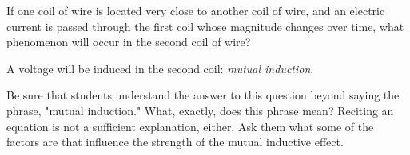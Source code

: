 

If one coil of wire is located very close to another coil of wire, and an electric current is passed through the first coil whose magnitude changes over time, what phenomenon will occur in the second coil of wire?







A voltage will be induced in the second coil: {\it mutual induction}.







Be sure that students understand the answer to this question beyond saying the phrase, "mutual induction."  What, exactly, does this phrase mean?  Reciting an equation is not a sufficient explanation, either.  Ask them what some of the factors are that influence the strength of the mutual inductive effect.




